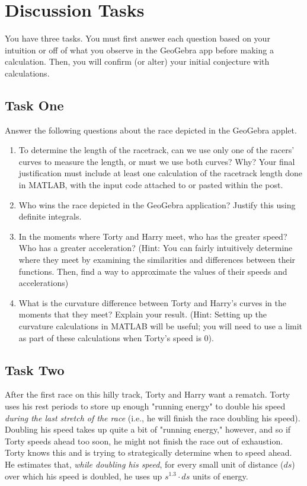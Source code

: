\documentclass{ximera}
\begin{document}
\section{Discussion Tasks}

You have three tasks. You must first answer each question based on your intuition or off of what you observe in the GeoGebra app before making a calculation. Then, you will confirm (or alter) your initial conjecture with calculations.

\subsection{Task One}

Answer the following questions about the race depicted in the GeoGebra applet.

\begin{enumerate}
\item To determine the length of the racetrack, can we use only one of the racers' curves to measure the length, or must we use both curves? Why? Your final justification must include at least one calculation of the racetrack length done in MATLAB, with the input code attached to or pasted within the post.

\item Who wins the race depicted in the GeoGebra application? Justify this using definite integrals.

\item In the moments where Torty and Harry meet, who has the greater speed? Who has a greater acceleration? (Hint: You can fairly intuitively determine where they meet by examining the similarities and differences between their functions. Then, find a way to approximate the values of their speeds and accelerations)

\item What is the curvature difference between Torty and Harry's curves in the moments that they meet? Explain your result. (Hint: Setting up the curvature calculations in MATLAB will be useful; you will need to use a limit as part of these calculations when Torty's speed is 0).
\end{enumerate}

\subsection{Task Two}

After the first race on this hilly track, Torty and Harry want a rematch. Torty uses his rest periods to store up enough "running energy" to double his speed \emph{during the last stretch of the race} (i.e., he will finish the race doubling his speed). Doubling his speed takes up quite a bit of "running energy," however, and so if Torty speeds ahead too soon, he might not finish the race out of exhaustion. Torty knows this and is trying to strategically determine when to speed ahead. He estimates that, \emph{while doubling his speed}, for every small unit of distance ($ds$) over which his speed is doubled, he uses up $s^{1.3}\cdot ds$ units of energy.
\end{document}
